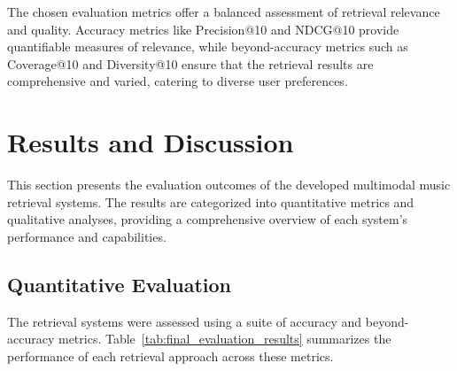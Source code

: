 \documentclass[sigconf]{acmart}
\begin{document}
The chosen evaluation metrics offer a balanced assessment of retrieval relevance and quality. Accuracy metrics like Precision@10 and NDCG@10 provide quantifiable measures of relevance, while beyond-accuracy metrics such as Coverage@10 and Diversity@10 ensure that the retrieval results are comprehensive and varied, catering to diverse user preferences.

\section{Results and Discussion}
\label{sec:results_discussion}

This section presents the evaluation outcomes of the developed multimodal music retrieval systems. The results are categorized into quantitative metrics and qualitative analyses, providing a comprehensive overview of each system's performance and capabilities.

\subsection{Quantitative Evaluation}
\label{subsec:quantitative_evaluation}

The retrieval systems were assessed using a suite of accuracy and beyond-accuracy metrics. Table~\ref{tab:final_evaluation_results} summarizes the performance of each retrieval approach across these metrics.
\end{document}
